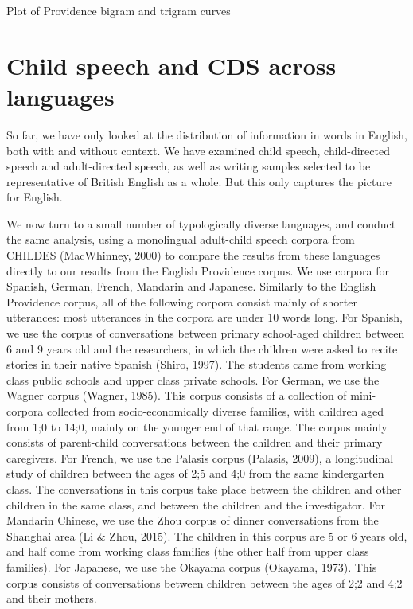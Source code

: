 \documentclass[11pt,]{article}
\begin{document}
Plot of Providence bigram and trigram curves

\hypertarget{child-speech-and-cds-across-languages}{%
\section{Child speech and CDS across languages}\label{child-speech-and-cds-across-languages}}

So far, we have only looked at the distribution of information in words in English, both with and without context. We have examined child speech, child-directed speech and adult-directed speech, as well as writing samples selected to be representative of British English as a whole. But this only captures the picture for English.

We now turn to a small number of typologically diverse languages, and conduct the same analysis, using a monolingual adult-child speech corpora from CHILDES (MacWhinney, 2000) to compare the results from these languages directly to our results from the English Providence corpus. We use corpora for Spanish, German, French, Mandarin and Japanese. Similarly to the English Providence corpus, all of the following corpora consist mainly of shorter utterances: most utterances in the corpora are under 10 words long. For Spanish, we use the corpus of conversations between primary school-aged children between 6 and 9 years old and the researchers, in which the children were asked to recite stories in their native Spanish (Shiro, 1997). The students came from working class public schools and upper class private schools. For German, we use the Wagner corpus (Wagner, 1985). This corpus consists of a collection of mini-corpora collected from socio-economically diverse families, with children aged from 1;0 to 14;0, mainly on the younger end of that range. The corpus mainly consists of parent-child conversations between the children and their primary caregivers. For French, we use the Palasis corpus (Palasis, 2009), a longitudinal study of children between the ages of 2;5 and 4;0 from the same kindergarten class. The conversations in this corpus take place between the children and other children in the same class, and between the children and the investigator. For Mandarin Chinese, we use the Zhou corpus of dinner conversations from the Shanghai area (Li \& Zhou, 2015). The children in this corpus are 5 or 6 years old, and half come from working class families (the other half from upper class families). For Japanese, we use the Okayama corpus (Okayama, 1973). This corpus consists of conversations between children between the ages of 2;2 and 4;2 and their mothers.
\end{document}
